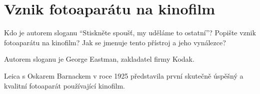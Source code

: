 \section{Vznik fotoaparátu na kinofilm}
Kdo je autorem sloganu \enquote{Stiskněte spoušť, my uděláme to ostatní}? Popište vznik fotoaparátu na 
kinofilm? Jak se jmenuje tento přístroj a jeho vynálezce?

Autorem sloganu je George Eastman, zakladatel firmy Kodak. 

Leica s Oskarem Barnackem v roce 1925 představila první skutečně úspěšný a kvalitní fotoaparát používající kinofilm.